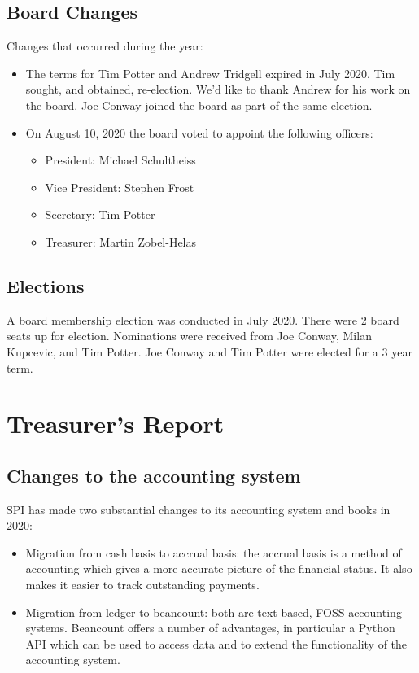 \documentclass[a4paper]{report}
\begin{document}
\section{Board Changes}

Changes that occurred during the year:

\begin{itemize}

\item The terms for Tim Potter and Andrew Tridgell expired in July 2020.  Tim sought, and obtained, re-election.  We'd like to thank Andrew for his work on the board.  Joe Conway joined the board as part of the same election.

\item On August 10, 2020 the board voted to appoint the following officers:

\begin{itemize}
\item President: Michael Schultheiss
\item Vice President: Stephen Frost
\item Secretary: Tim Potter
\item Treasurer: Martin Zobel-Helas
\end{itemize}

\end{itemize}

\section{Elections}

A board membership election was conducted in July 2020.  There were 2 board seats up for election.  Nominations were received from Joe Conway, Milan Kupcevic, and Tim Potter.  Joe Conway and Tim Potter were elected for a 3 year term.

\chapter{Treasurer's Report}

\section{Changes to the accounting system}

SPI has made two substantial changes to its accounting system and books in 2020:

\begin{itemize}

\item Migration from cash basis to accrual basis: the accrual basis is a method of accounting which gives a more accurate picture of the financial status.  It also makes it easier to track outstanding payments.

\item Migration from ledger to beancount: both are text-based, FOSS accounting systems.  Beancount offers a number of advantages, in particular a Python API which can be used to access data and to extend the functionality of the accounting system.

\end{itemize}
\end{document}
